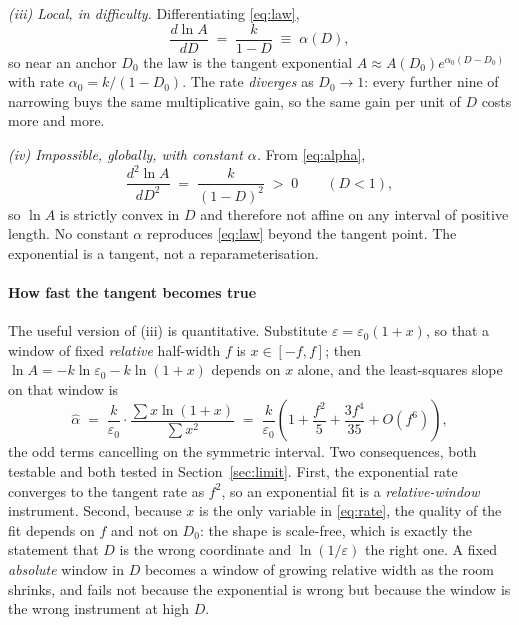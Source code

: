 \documentclass[conference]{IEEEtran}
\theoremstyle{definition}
\begin{document}
\emph{(iii) Local, in difficulty.} Differentiating \eqref{eq:law},
\begin{equation}
\frac{d\ln A}{dD} \;=\; \frac{k}{1-D} \;\equiv\; \alpha(D),
\label{eq:alpha}
\end{equation}
so near an anchor $D_0$ the law is the tangent exponential
$A\approx A(D_0)e^{\alpha_0(D-D_0)}$ with rate $\alpha_0=k/(1-D_0)$. The rate
\emph{diverges} as $D_0\to1$: every further nine of narrowing buys the same
multiplicative gain, so the same gain per unit of $D$ costs more and more.

\emph{(iv) Impossible, globally, with constant $\alpha$.} From
\eqref{eq:alpha},
\begin{equation}
\frac{d^{2}\ln A}{dD^{2}} \;=\; \frac{k}{(1-D)^{2}} \;>\; 0
\qquad (D<1),
\label{eq:convex}
\end{equation}
so $\ln A$ is strictly convex in $D$ and therefore not affine on any interval of
positive length. No constant $\alpha$ reproduces \eqref{eq:law} beyond the tangent
point. The exponential is a tangent, not a reparameterisation.

\paragraph{How fast the tangent becomes true} The useful version of (iii) is
quantitative. Substitute $\varepsilon=\varepsilon_0(1+x)$, so that a window of
fixed \emph{relative} half-width $f$ is $x\in[-f,f]$; then
$\ln A=-k\ln\varepsilon_0-k\ln(1+x)$ depends on $x$ alone, and the least-squares
slope on that window is
\begin{equation}
\hat\alpha \;=\; \frac{k}{\varepsilon_0}\cdot
\frac{\sum x\ln(1+x)}{\sum x^{2}}
\;=\; \frac{k}{\varepsilon_0}\left(1+\frac{f^{2}}{5}+\frac{3f^{4}}{35}+O(f^{6})\right),
\label{eq:rate}
\end{equation}
the odd terms cancelling on the symmetric interval. Two consequences, both
testable and both tested in Section~\ref{sec:limit}. First, the exponential rate
converges to the tangent rate as $f^{2}$, so an exponential fit is a
\emph{relative-window} instrument. Second, because $x$ is the only variable in
\eqref{eq:rate}, the quality of the fit depends on $f$ and not on $D_0$: the shape
is scale-free, which is exactly the statement that $D$ is the wrong coordinate and
$\ln(1/\varepsilon)$ the right one. A fixed \emph{absolute} window in $D$ becomes a
window of growing relative width as the room shrinks, and fails not because the
exponential is wrong but because the window is the wrong instrument at high $D$.
\end{document}
